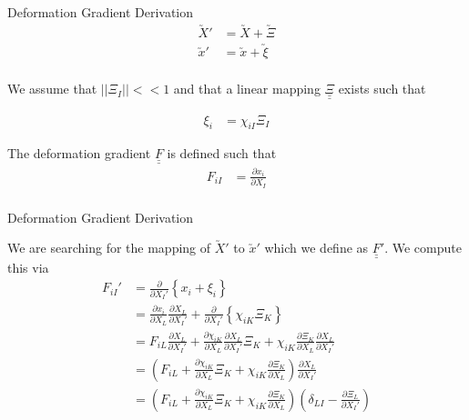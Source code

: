 \documentclass[11pt]{beamer}
\newcommand{\TEN}[1]{\underline{\underline{#1}}}
\newcommand{\VEC}[1]{\utilde{#1}}
\newcommand{\LTN}[1]{\left|\left| #1 \right|\right|}
\begin{document}
\begin{frame}{Deformation Gradient Derivation}
\begin{align*}
\VEC{X}' &= \VEC{X}+\VEC{\Xi}\\
\VEC{x}' &= \VEC{x}+\VEC{\xi}\\
\end{align*}

We assume that $\LTN{\Xi_{I}} << 1$ and that a linear mapping $\TEN{\Xi}$ exists such that

\begin{align*}
\xi_i &= \chi_{iI} \Xi_I
\end{align*}

The deformation gradient $\TEN{F}$ is defined such that
\begin{align*}
F_{iI} &= \frac{\partial x_i}{\partial X_I}\\
\end{align*}
\end{frame}

\begin{frame}{Deformation Gradient Derivation}

We are searching for the mapping of $\VEC{X}'$ to $\VEC{x}'$ which we define as $\TEN{F}'$. We compute this via
\begin{align*}
F_{iI}' &= \frac{\partial}{\partial X_I'} \left\{x_i + \xi_i\right\}\\
&= \frac{\partial x_i}{\partial X_L}\frac{\partial X_L}{\partial X_I'} + \frac{\partial}{\partial X_I'} \left\{\chi_{iK}\Xi_{K}\right\}\\
&= F_{iL} \frac{\partial X_L}{\partial X_I'} + \frac{\partial \chi_{iK}}{\partial X_L}\frac{\partial X_L}{\partial X_I'}\Xi_{K} + \chi_{iK} \frac{\partial \Xi_K}{\partial X_L}\frac{\partial X_L}{\partial X_I'}\\
&= \left(F_{iL} + \frac{\partial \chi_{iK}}{\partial X_L}\Xi_{K} + \chi_{iK} \frac{\partial \Xi_K}{\partial X_L}\right)\frac{\partial X_L}{\partial X_I'}\\
&= \left(F_{iL} + \frac{\partial \chi_{iK}}{\partial X_L}\Xi_{K} + \chi_{iK} \frac{\partial \Xi_K}{\partial X_L}\right)\left(\delta_{LI} - \frac{\partial \Xi_L}{\partial X_I'}\right)\\
\end{align*}

\end{frame}
\end{document}
